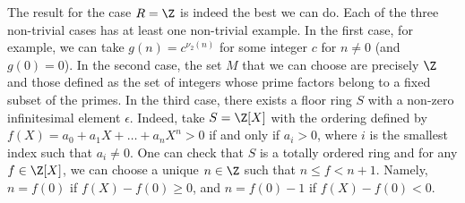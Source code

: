 The result for the case $R = \Z$ is indeed the best we can do.
Each of the three non-trivial cases has at least one non-trivial example.
In the first case, for example, we can take $g(n) = c^{\nu_2(n)}$ for some integer $c$ for $n \neq 0$ (and $g(0) = 0$).
In the second case, the set $M$ that we can choose are precisely $\Z$ and those defined as the set of integers whose prime factors belong to a fixed subset of the primes.
In the third case, there exists a floor ring $S$ with a non-zero infinitesimal element $\epsilon$.
Indeed, take $S = \Z[X]$ with the ordering defined by $f(X) = a_0 + a_1 X + \ldots + a_n X^n > 0$ if and only if $a_i > 0$, where $i$ is the smallest index such that $a_i \neq 0$.
One can check that $S$ is a totally ordered ring and for any $f \in \Z[X]$, we can choose a unique $n \in \Z$ such that $n \leq f < n + 1$.
Namely, $n = f(0)$ if $f(X) - f(0) \geq 0$, and $n = f(0) - 1$ if $f(X) - f(0) < 0$.

